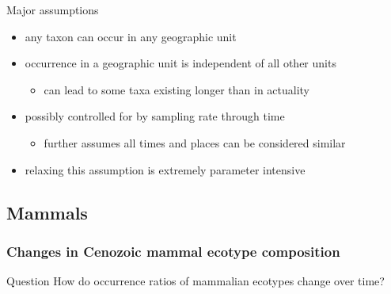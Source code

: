 \documentclass{beamer}
\begin{document}
\begin{frame}
  \begin{block}{Major assumptions}
    \begin{itemize}
      \item any taxon can occur in any geographic unit 
      \item occurrence in a geographic unit is independent of all other units
        \begin{itemize}
          \item can lead to some taxa existing longer than in actuality
        \end{itemize}
      \item possibly controlled for by sampling rate through time
        \begin{itemize}
          \item further assumes all times and places can be considered similar
        \end{itemize}
      \item relaxing this assumption is extremely parameter intensive
    \end{itemize}
  \end{block}
\end{frame}

\subsection{Mammals}
\begin{frame}
  \frametitle{Changes in Cenozoic mammal ecotype composition}

  \begin{alertblock}{Question}
    How do occurrence ratios of mammalian ecotypes change over time?
  \end{alertblock}
\end{frame}
\end{document}
